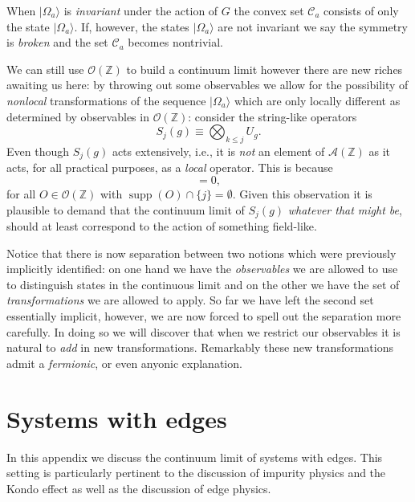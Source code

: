 \documentclass[prl,twocolumn,lengthcheck,superscriptaddress]{revtex4-1}
\newcommand{\supp}{\operatorname{supp}}
\theoremstyle{definition}
\theoremstyle{remark}
\begin{document}
When $|\Omega_a\rangle$ is \emph{invariant} under the action of $G$ the convex set $\mathcal{C}_a$ consists of only the state $|\Omega_a\rangle$. If, however, the states $|\Omega_a\rangle$ are not invariant we say the symmetry is \emph{broken} and the set $\mathcal{C}_a$ becomes nontrivial. 

We can still use $\mathcal{O}(\mathbb{Z})$ to build a continuum limit however there are new riches awaiting us here: by throwing out some observables we allow for the possibility of \emph{nonlocal} transformations of the sequence $|\Omega_a\rangle$ which are only locally different as determined by observables in $\mathcal{O}(\mathbb{Z})$: consider the string-like operators
\begin{equation}
	S_j(g) \equiv \bigotimes_{k\le j} U_g.
\end{equation}
Even though $S_j(g)$ acts extensively, i.e., it is \emph{not} an element of $\mathcal{A}(\mathbb{Z})$ as it acts, for all practical purposes, as a \emph{local} operator. This is because 
\begin{equation}
	[O, S_j(g)] = 0,
\end{equation}
for all $O\in \mathcal{O}(\mathbb{Z})$ with $\supp(O) \cap \{j\} = \emptyset$.
Given this observation it is plausible to demand that the continuum limit of $S_j(g)$ \emph{whatever that might be}, should at least correspond to the action of something field-like. 

Notice that there is now separation between two notions which were previously implicitly identified: on one hand we have the \emph{observables} we are allowed to use to distinguish states in the continuous limit and on the other we have the set of \emph{transformations} we are allowed to apply. So far we have left the second set essentially implicit, however, we are now forced to spell out the separation more carefully. In doing so we will discover that when we restrict our observables it is natural to \emph{add} in new transformations. Remarkably these new transformations admit a \emph{fermionic}, or even {anyonic} explanation.




\section{Systems with edges}
In this appendix we discuss the continuum limit of systems with edges. This setting is particularly pertinent to the discussion of impurity physics and the Kondo effect as well as the discussion of edge physics. 
\end{document}
